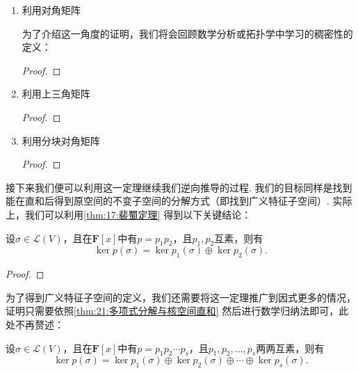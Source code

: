 \begin{enumerate}
    \item 利用对角矩阵

          为了介绍这一角度的证明，我们将会回顾数学分析或拓扑学中学习的稠密性的定义：
          \begin{definition}

          \end{definition}

          \begin{lemma}

          \end{lemma}

          \begin{proof}

          \end{proof}

    \item 利用上三角矩阵

          \begin{proof}

          \end{proof}

    \item 利用分块对角矩阵

          \begin{proof}

          \end{proof}
\end{enumerate}

接下来我们便可以利用这一定理继续我们逆向推导的过程. 我们的目标同样是找到能在直和后得到原空间的不变子空间的分解方式（即找到广义特征子空间）. 实际上，我们可以利用\autoref{thm:17:裴蜀定理} 得到以下关键结论：
\begin{theorem} \label{thm:21:多项式分解与核空间直和}
    设$\sigma\in \mathcal{L}(V)$，且在$\mathbf{F}[x]$中有$p=p_1p_2$，且$p_1,p_2$互素，则有
    \[\ker p(\sigma)=\ker p_1(\sigma)\oplus\ker p_2(\sigma).\]
\end{theorem}

\begin{proof}

\end{proof}

为了得到广义特征子空间的定义，我们还需要将这一定理推广到因式更多的情况，证明只需要依照\autoref{thm:21:多项式分解与核空间直和} 然后进行数学归纳法即可，此处不再赘述：
\begin{theorem} \label{thm:21:多项式分解与核空间直和2}
    设$\sigma\in \mathcal{L}(V)$，且在$\mathbf{F}[x]$中有$p=p_1p_2\cdots p_s$，且$p_1,p_2,\ldots,p_s$两两互素，则有\[\ker p(\sigma)=\ker p_1(\sigma)\oplus\ker p_2(\sigma)\oplus\cdots\oplus\ker p_s(\sigma).\]
\end{theorem}

